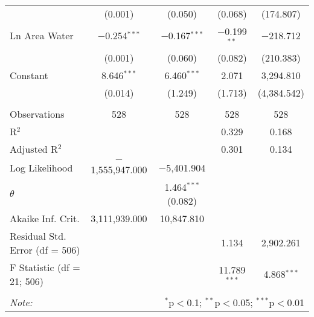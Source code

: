 \begin{table}[!htbp]
\begin{tabular}{@{\extracolsep{5pt}}lcccc}
  & (0.001) & (0.050) & (0.068) & (174.807) \\ 
  Ln Area Water & $-$0.254$^{***}$ & $-$0.167$^{***}$ & $-$0.199$^{**}$ & $-$218.712 \\ 
  & (0.001) & (0.060) & (0.082) & (210.383) \\ 
  Constant & 8.646$^{***}$ & 6.460$^{***}$ & 2.071 & 3,294.810 \\ 
  & (0.014) & (1.249) & (1.713) & (4,384.542) \\ 
 \hline \\[-1.8ex] 
Observations & 528 & 528 & 528 & 528 \\ 
R$^{2}$ &  &  & 0.329 & 0.168 \\ 
Adjusted R$^{2}$ &  &  & 0.301 & 0.134 \\ 
Log Likelihood & $-$1,555,947.000 & $-$5,401.904 &  &  \\ 
$\theta$ &  & 1.464$^{***}$  (0.082) &  &  \\ 
Akaike Inf. Crit. & 3,111,939.000 & 10,847.810 &  &  \\ 
Residual Std. Error (df = 506) &  &  & 1.134 & 2,902.261 \\ 
F Statistic (df = 21; 506) &  &  & 11.789$^{***}$ & 4.868$^{***}$ \\ 
\hline 
\hline \\[-1.8ex] 
\textit{Note:}  & \multicolumn{4}{r}{$^{*}$p$<$0.1; $^{**}$p$<$0.05; $^{***}$p$<$0.01} \\ 
\end{tabular} 
\end{table} 
